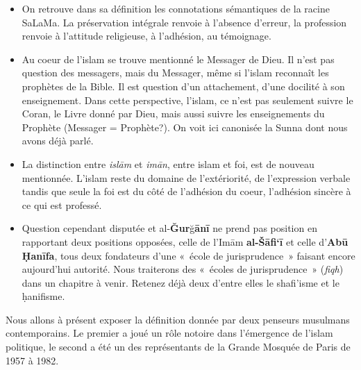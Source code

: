 \begin{itemize}
\item
  On retrouve dans sa définition les connotations sémantiques de la
  racine SaLaMa. La préservation intégrale renvoie à l'absence d'erreur,
  la profession renvoie à l'attitude religieuse, à l'adhésion, au
  témoignage.
\item
  Au coeur de l'islam se trouve mentionné le Messager de Dieu. Il n'est
  pas question des messagers, mais du Messager, même si l'islam
  reconnaît les prophètes de la Bible. Il est question d'un attachement,
  d'une docilité à son enseignement. Dans cette perspective, l'islam, ce
  n'est pas seulement suivre le Coran, le Livre donné par Dieu, mais
  aussi suivre les enseignements du Prophète (Messager = Prophète?). On
  voit ici canonisée la Sunna dont nous avons déjà parlé.
\item
  La distinction entre \emph{islām} et \emph{imān}, entre islam et foi,
  est de nouveau mentionnée. L'islam reste du domaine de l'extériorité,
  de l'expression verbale tandis que seule la foi est du côté de
  l'adhésion du coeur, l'adhésion sincère à ce qui est professé.
\item
  Question cependant disputée et al-\textbf{Ğur}ğ\textbf{ānī} ne prend
  pas position en rapportant deux positions opposées, celle de l'Imām
  \textbf{al-Šāfi`ī} et celle d'\textbf{Abū Ḥanīfa}, tous deux
  fondateurs d'une «~école de jurisprudence~» faisant encore aujourd'hui
  autorité. Nous traiterons des «~écoles de jurisprudence~»
  (\emph{fiqh}) dans un chapitre à venir. Retenez déjà deux d'entre
  elles le shafi'isme et le ḥanifisme.
\end{itemize}

Nous allons à présent exposer la définition donnée par deux penseurs
musulmans contemporains. Le premier a joué un rôle notoire dans
l'émergence de l'islam politique, le second a été un des représentants
de la Grande Mosquée de Paris de 1957 à 1982.


